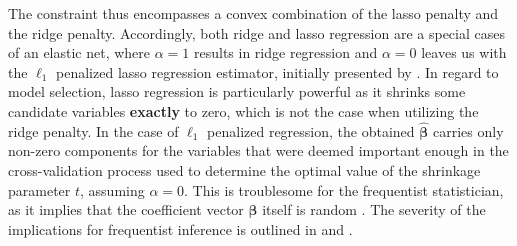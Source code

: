 \documentclass[a4paper,12pt, headsepline]{scrartcl}
\numberwithin{equation}{section}
\begin{document}
The constraint thus encompasses a convex combination of the lasso penalty and the ridge penalty. Accordingly, both ridge and lasso regression are a special cases of an elastic net, where $\alpha = 1$ results in ridge regression and $\alpha = 0$ leaves us with the $\ell_1$ penalized lasso regression estimator, initially presented by \citet{tibshirani96}. In regard to model selection, lasso regression is particularly powerful as it shrinks some candidate variables \textbf{exactly} to zero, which is not the case when utilizing the ridge penalty. In the case of $\ell_1$ penalized regression, the obtained $\bm{\hat{\beta}}$ carries only non-zero components for the variables that were deemed important enough in the cross-validation process used to determine the optimal value of the shrinkage parameter $t$, assuming $\alpha = 0$. This is troublesome for the frequentist statistician, as it implies that the coefficient vector $\bm{\beta}$ itself is random \citep{Lee2016}. The severity of the implications for frequentist inference is outlined in \citet{benjamini05} and \citet{benjamini09}.
\end{document}
